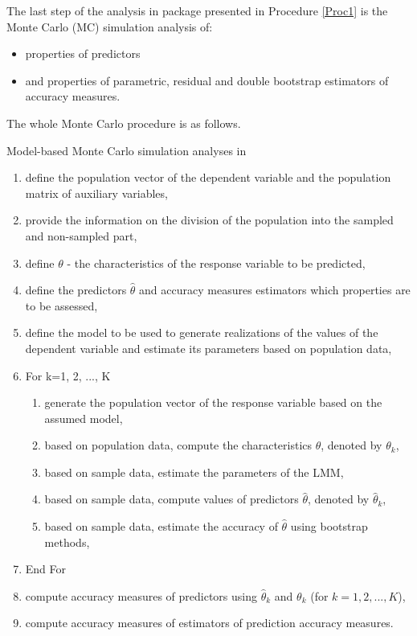 The last step of the analysis in  package presented in Procedure \ref{Proc1} is the Monte Carlo (MC) simulation analysis of:
\begin{itemize}
	\item properties of predictors
	\item and properties of parametric, residual and double bootstrap estimators of accuracy measures.
\end{itemize}
The whole Monte Carlo procedure is as follows.

\begin{procedure} Model-based Monte Carlo simulation analyses in 
\label{Proc2}
    \begin{enumerate}[label*=\arabic*.]
    	\item define the population vector of the dependent variable and the population matrix of auxiliary variables,
		\item provide the information on the division of the population into the sampled and non-sampled part,
		\item define $\theta$ - the characteristics of the response variable to be predicted,
		\item define the predictors $\hat{\theta}$ and accuracy measures estimators which properties are to be assessed,
		\item define the model to be used to generate realizations of the values of the dependent variable and estimate its parameters based on population data,
		\item For {k=1, 2, ..., K}
\begin{enumerate}[label*=\arabic*.]
		\item  generate the population vector of the response variable based on the assumed model,
		\item  based on population data, compute the characteristics $\theta$, denoted by  $\theta_k$,
		\item  based on sample data, estimate the parameters of the LMM,
		\item  based on sample data, compute values of predictors $\hat{\theta}$, denoted by  $\hat{\theta}_k$,
		\item  based on sample data, estimate the accuracy of $\hat{\theta}$ using bootstrap methods,
\end{enumerate}
 \item End For
	\item compute accuracy measures of predictors using $\hat{\theta}_k$ and $\theta_k$ (for $k=1,2, ..., K$),
	\item compute accuracy measures of estimators of prediction accuracy measures.
\end{enumerate}
\end{procedure}


